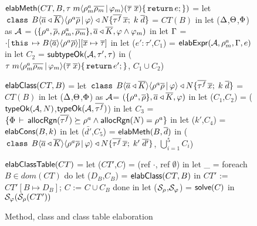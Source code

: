 \newcommand{\hdOf}[2]{\C{class}\; #1\angAlpha\inang{\rhoalloc\rhobar \,|\, #2} \extends \fbN}
\begin{figure}

\begin{codeml}
${\sf elabMeth}(CT, B, \tau \; m\langle \rho^a_m\overline{\rho_m} \,|\, \varphi_m \rangle (\overline{\tau} \; \overline{x})\{\,{\tt return}\, e;\})$ = 
  let $\hdOf{B}{\varphi}\{\bar{\tau^f}\,\xbar;\;k\;\bar{d}\}$ = $CT(B)$ in
  let ($\Delta$,$\Theta$,$\Phi$) as ${\mathcal{A}}$ = 
            $(\{\rho^a,\overline{\rho},\rho^a_m,\overline{\rho_m}\},\overline{a} \triangleleft \overline{K},\varphi \wedge \varphi_m)$ in
  let $\Gamma$ = $\cdot[\,{\tt this}\, \mapsto B\langle \overline{a} \rangle\langle \rho^a\overline{\rho} \rangle][\overline{x} \mapsto \overline{\tau}]$ in
  let ($e':\tau'$,$C_1$) = ${\sf elabExpr} ({\mathcal{A}},\rho^a_m,\Gamma,e)$ in
  let $C_2$ = ${\sf subtypeOk}({{\mathcal{A}}},{\tau'},{\tau})$ in
    ($\tau \; m\langle \rho^a_m\overline{\rho_m} \,|\, \varphi_m \rangle (\overline{\tau} \; \overline{x})\{\,{\tt return}\, e';\}$, $C_1 \cup C_2$)
\end{codeml}

\begin{codeml}
${\sf elabClass}(CT,B)$ = 
  let $\hdOf{B}{\varphi}\{\bar{\tau^f}\,\xbar;\;k\;\bar{d}\}$ = $CT(B)$ in
  let ($\Delta$,$\Theta$,$\Phi$) as ${\mathcal{A}}$= $(\{\rho^a,\overline{\rho}\},\overline{a} \triangleleft \overline{K},\varphi)$ in
  let ($C_1$,$C_2$) = (${\sf typeOk}({{\mathcal{A}}},{N})$,${\sf typeOk}({{\mathcal{A}}},{\overline{\tau^f}})$) in
  let $C_3$ = $\{\Phi\,\vdash\,{\sf allocRgn}(\overline{\tau^f}) \succeq \rho^a \wedge {\sf allocRgn}(N) = \rho^a\}$ in
  let ($k'$,$C_4$) = ${\sf elabCons}(B,k)$ in
  let ($\bar{d'}$,$C_5$) = ${\sf elabMeth}(B,\overline{d})$ in
    ($\hdOf{B}{\varphi}\{\bar{\tau^f}\,\xbar;\;k'\;\bar{d'}\}$, $\bigcup_{i=1}^5 C_i$)
\end{codeml}

\begin{codeml}
${\sf elabClassTable}(CT)$ = 
  let ($CT'$,$C$) = (ref $\cdot$, ref $\emptyset$) in
  let _ = foreach $B \in dom(CT)$ do
            let ($D_B$,$C_B$) = ${\sf elabClass}(CT,B)$ in
              $CT'$ := $CT'[B \mapsto D_B]$;
              $C$ := $C \cup C_B$
           done in
  let ($\mathcal{S}_\rho$,$\mathcal{S}_\varphi$) = ${\sf solve}(C)$ in
    $\mathcal{S}_\varphi(\mathcal{S}_\rho(CT')) $
      
\end{codeml}

\caption{Method, class and class table elaboration}
\label{fig:fb-elabmeth}
\end{figure}
